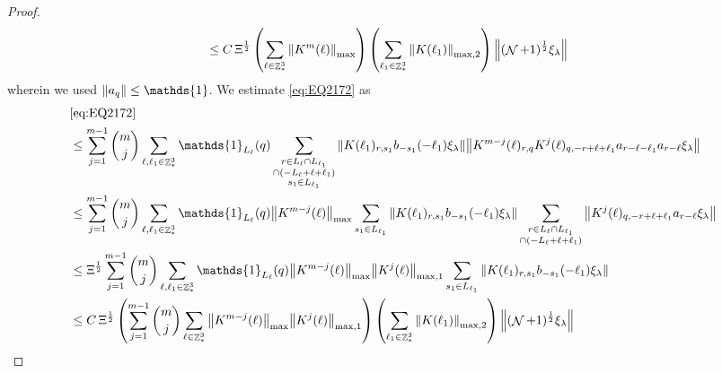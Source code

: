 \documentclass[12pt,a4paper]{article}
\numberwithin{equation}{section}
\newcommand{\1}{\mathbb{I}}
\DeclareMathOperator{\Z}{\mathbb{Z}}
\DeclareMathOperator{\NN}{\mathcal{N}}
\newcommand{\half}{\frac{1}{2}}
\theoremstyle{plain}
\theoremstyle{definition}
\theoremstyle{remark}
\theoremstyle{plain}
\theoremstyle{definition}
\theoremstyle{remark}
\begin{document}
\begin{proof}
\begin{align}
	&\leq C\, \Xi^\half \left(\sum\limits_{\ell \in \Z^3_*} \norm{K^m(\ell)}_{\max}\right)\left( \sum\limits_{\ell_1\in \Z^3_*} \norm{ K(\ell_1)}_{\mathrm{max,2}} \right) \norm{(\NN+1)^\half\xi_\lambda}\label{eq:estEQ2171}
\end{align}
wherein we used $\norm{a_q} \leq \mathds{1}$.
We estimate \eqref{eq:EQ2172} as
\begin{align}
	&\eqref{eq:EQ2172}\nonumber\\
	&\leq\sum\limits_{j=1}^{m-1} {{m}\choose j} \sum\limits_{\ell, \ell_1\in \Z^3_*}\mathds{1}_{L_{\ell}}(q) \sum\limits_{\substack{r\in L_{\ell} \cap L_{\ell_1} \\ \cap (-L_{\ell}+\ell+\ell_1)\\s_1\in L_{\ell_1}}}  \norm{K(\ell_1)_{r,s_1} b_{-s_1}(-\ell_1) \xi_\lambda}\norm{ K^{m-j}(\ell)_{r,q} K^j(\ell)_{q,-r+\ell+\ell_1} a_{r-\ell-\ell_1} a_{r-\ell} \xi_\lambda }\nonumber\\
	&\leq\sum\limits_{j=1}^{m-1} {{m}\choose j} \sum\limits_{\ell, \ell_1\in \Z^3_*}\mathds{1}_{L_{\ell}}(q) \norm{K^{m-j}(\ell)}_{\max} \sum\limits_{s_1\in L_{\ell_1}} \norm{K(\ell_1)_{r,s_1} b_{-s_1}(-\ell_1) \xi_\lambda} \sum\limits_{\substack{r\in L_{\ell} \cap L_{\ell_1} \\ \cap (-L_{\ell}+\ell+\ell_1)}}  \norm{  K^j(\ell)_{q,-r+\ell+\ell_1} a_{r-\ell} \xi_\lambda }\nonumber\\
	&\leq \Xi^\half \sum\limits_{j=1}^{m-1} {{m}\choose j} \sum\limits_{\ell, \ell_1\in \Z^3_*}\mathds{1}_{L_{\ell}}(q)  \norm{K^{m-j}(\ell)}_{\max} \norm{K^{j}(\ell)}_{\mathrm{max,1}}  \sum\limits_{s_1\in L_{\ell_1}} \norm{K(\ell_1)_{r,s_1} b_{-s_1}(-\ell_1) \xi_\lambda} \nonumber\\
	&\leq  C\,\Xi^\half \left( \sum\limits_{j=1}^{m-1} {{m}\choose j} \sum\limits_{\ell \in \Z^3_*} \norm{K^{m-j}(\ell)}_{\max} \norm{ K^{j}(\ell)}_{\max,1}\right) \left( \sum\limits_{ \ell_1\in \Z^3_*}\norm{ K(\ell_1) }_{\mathrm{max,2}} \right) \norm{ (\NN+1)^\half \xi_\lambda }\label{eq:estEQ2172}
\end{align}


\end{proof}
\end{document}
